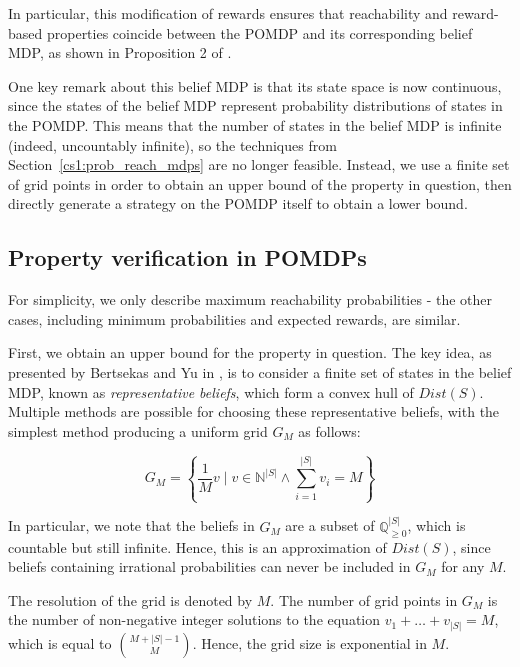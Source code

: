 In particular, this modification of rewards ensures that reachability and reward-based properties coincide between the POMDP and its corresponding belief MDP, as shown in Proposition 2 of \cite{norman_verification_2017}.

One key remark about this belief MDP is that its state space is now continuous, since the states of the belief MDP represent probability distributions of states in the POMDP. This means that the number of states in the belief MDP is infinite (indeed, uncountably infinite), so the techniques from Section~\ref{cs1:prob_reach_mdps} are no longer feasible. Instead, we use a finite set of grid points in order to obtain an upper bound of the property in question, then directly generate a strategy on the POMDP itself to obtain a lower bound. %

\subsection{Property verification in POMDPs}
\label{cs2:properties_pomdps}

For simplicity, we only describe maximum reachability probabilities - the other cases, including minimum probabilities and expected rewards, are similar.

First, we obtain an upper bound for the property in question. The key idea, as presented by Bertsekas and Yu in \cite{bertsekas_approximate_2006}, is to consider a finite set of states in the belief MDP, known as \emph{representative beliefs}, which form a convex hull of $Dist(S)$. Multiple methods are possible for choosing these representative beliefs, with the simplest method producing a uniform grid $G_M$ as follows:

\begin{equation*}
    G_M = \left\{\frac{1}{M} v \mid v \in \mathbb{N}^{|S|} \wedge \mbox{$\sum_{i=1}^{|S|}$} v_i = M \right\}
\end{equation*}

In particular, we note that the beliefs in $G_M$ are a subset of $\mathbb{Q}_{\geq 0}^{|S|}$, which is countable but still infinite. Hence, this is an approximation of $Dist(S)$, since beliefs containing irrational probabilities can never be included in $G_M$ for any $M$.

The resolution of the grid is denoted by $M$. The number of grid points in $G_M$ is the number of non-negative integer solutions to the equation $v_1 + \dots + v_{|S|} = M$, which is equal to ${M + |S| - 1 \choose M}$. Hence, the grid size is exponential in $M$.

